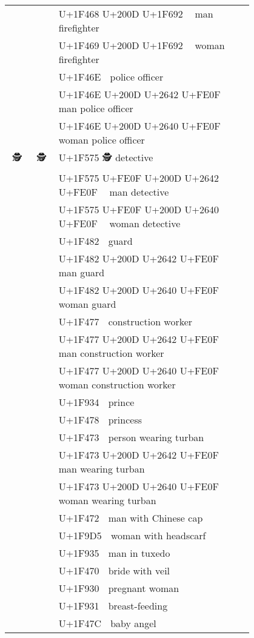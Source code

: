 \documentclass[a4paper,12pt]{article}
\newcommand{\fontA}[1]{{\fontspec[RawFeature={dist,ccmp}]{Segoe UI Emoji} #1}}
\newcommand{\fontB}[1]{{\fontspec[Ligatures=Common,RawFeature={+ccmp}]{Symbola_Hinted.ttf} #1}}
\begin{document}
\begin{longtable}[c]{ccp{0.8\linewidth}}
\fontA{👨‍🚒}&\fontB{👨‍🚒}&U+1F468 U+200D U+1F692 👨‍🚒 man firefighter\\
\fontA{👩‍🚒}&\fontB{👩‍🚒}&U+1F469 U+200D U+1F692 👩‍🚒 woman firefighter\\
\fontA{👮}&\fontB{👮}&U+1F46E 👮 police officer\\
\fontA{👮‍♂️}&\fontB{👮‍♂️}&U+1F46E U+200D U+2642 U+FE0F 👮‍♂️ man police officer\\
\fontA{👮‍♀️}&\fontB{👮‍♀️}&U+1F46E U+200D U+2640 U+FE0F 👮‍♀️ woman police officer\\
\fontA{🕵}&\fontB{🕵}&U+1F575 🕵 detective\\
\fontA{🕵️‍♂️}&\fontB{🕵️‍♂️}&U+1F575 U+FE0F U+200D U+2642 U+FE0F 🕵️‍♂️ man detective\\
\fontA{🕵️‍♀️}&\fontB{🕵️‍♀️}&U+1F575 U+FE0F U+200D U+2640 U+FE0F 🕵️‍♀️ woman detective\\
\fontA{💂}&\fontB{💂}&U+1F482 💂 guard\\
\fontA{💂‍♂️}&\fontB{💂‍♂️}&U+1F482 U+200D U+2642 U+FE0F 💂‍♂️ man guard\\
\fontA{💂‍♀️}&\fontB{💂‍♀️}&U+1F482 U+200D U+2640 U+FE0F 💂‍♀️ woman guard\\
\fontA{👷}&\fontB{👷}&U+1F477 👷 construction worker\\
\fontA{👷‍♂️}&\fontB{👷‍♂️}&U+1F477 U+200D U+2642 U+FE0F 👷‍♂️ man construction worker\\
\fontA{👷‍♀️}&\fontB{👷‍♀️}&U+1F477 U+200D U+2640 U+FE0F 👷‍♀️ woman construction worker\\
\fontA{🤴}&\fontB{🤴}&U+1F934 🤴 prince\\
\fontA{👸}&\fontB{👸}&U+1F478 👸 princess\\
\fontA{👳}&\fontB{👳}&U+1F473 👳 person wearing turban\\
\fontA{👳‍♂️}&\fontB{👳‍♂️}&U+1F473 U+200D U+2642 U+FE0F 👳‍♂️ man wearing turban\\
\fontA{👳‍♀️}&\fontB{👳‍♀️}&U+1F473 U+200D U+2640 U+FE0F 👳‍♀️ woman wearing turban\\
\fontA{👲}&\fontB{👲}&U+1F472 👲 man with Chinese cap\\
\fontA{🧕}&\fontB{🧕}&U+1F9D5 🧕 woman with headscarf\\
\fontA{🤵}&\fontB{🤵}&U+1F935 🤵 man in tuxedo\\
\fontA{👰}&\fontB{👰}&U+1F470 👰 bride with veil\\
\fontA{🤰}&\fontB{🤰}&U+1F930 🤰 pregnant woman\\
\fontA{🤱}&\fontB{🤱}&U+1F931 🤱 breast-feeding\\
\fontA{👼}&\fontB{👼}&U+1F47C 👼 baby angel\\

\end{longtable}
\end{document}
